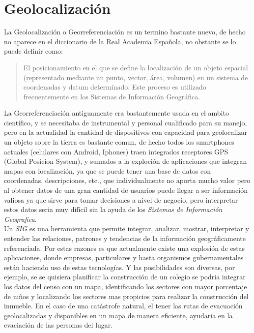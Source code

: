 \section{Geolocalizaci\'on} %
\label{sec:geolocalizacion}
  La Geolocalizaci\'on o Georreferenciación es un termino bastante nuevo, de hecho no aparece en el diccionario de la Real Academia Espa\~nola, no obstante se lo puede definir como:

  \begin{quote}
    El posicionamiento en el que se define la localización de un objeto espacial (representado mediante un punto, vector, área, volumen) en un sistema de coordenadas y datum determinado. Este proceso es utilizado frecuentemente en los Sistemas de Información Geográfica.\cite{Georreferenciacion}
  \end{quote}


  La Georreferenciación antiguamente era bastantemente usada en el ambito científico, y se necesitaba de instrumental y personal cualificado para su manejo, pero en la actualidad la cantidad de dispositivos con capacidad para geolocalizar un objeto sobre la tierra es bastante comun, de hecho todos los smartphones actuales (celulares con Android, Iphones) traen integrados receptores GPS (Global Posicion System),  y sumados a la exploci\'on de aplicaciones  que integran mapas con localizaci\'on, ya que se puede tener una base de datos con coordenadas, descripciones, etc., que individualmente no aporta mucho valor pero al obtener datos de una gran cantidad de usuarios puede llegar a ser informaci\'on valiosa ya que sirve para tomar decisiones a nivel de negocio, pero interpretar estos datos seria muy difícil sin la ayuda de los \emph{Sistemas de Informaci\'on Geografica}.\\

  Un \emph{SIG} es una herramienta que permite integrar, analizar, mostrar, interpretar y  entender las relaciones, patrones y tendencias de la información geográficamente referenciada.
  Por estas razones es que actualmente existe una explosi\'on de estas aplicaciones, donde empresas, particulares y hasta organismos gubernamentales est\'an haciendo uso de estas tecnologías.
  Y las posibilidades son diversas, por ejemplo, se se quisiera planificar la construcci\'on de un colegio se podria integrar los datos del censo con un mapa, identificando los sectores con mayor porcentaje de ni\~nos y localizando los sectores mas propicios para realizar la construcción del inmueble. En el caso de una catástrofe natural, el tener las rutas de evacuaci\'on geolocalizadas y disponibles en un mapa de manera eficiente,  ayudaria en la evaciaci\'on de las personas del lugar.\\


